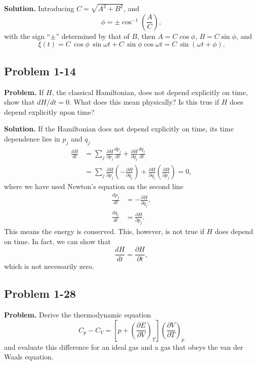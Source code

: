 \documentclass[twocolumn, 10pt]{article}
\numberwithin{equation}{section}
\newenvironment{problem}
{\par\medskip\sffamily \color{problue}
  \textbf{Problem. }\ignorespaces}
{\medskip}
\newenvironment{solution}
{\par\medskip
  \textbf{Solution. }\ignorespaces}
{\medskip}
\begin{document}
\begin{solution}
Introducing $C = \sqrt{A^2 + B^2}$,
and
$$\phi = \pm \cos^{-1} \left( \frac A C \right),$$
with the sign ``$\pm$'' determined by that of $B$,
then $A = C \cos\phi$, $B = C \sin\phi$, and
$$
\xi(t) = C \, \cos\phi \, \sin \omega t + C \, \sin\phi \cos \omega t
= C \, \sin(\omega t + \phi).
$$
\end{solution}


\subsection{Problem 1-14}

\begin{problem}
If $H$, the classical Hamiltonian, does not depend explicitly on time,
show that $dH/dt = 0$.
What does this mean physically?
Is this true if $H$ does depend explicitly upon time?
\end{problem}

\begin{solution}
If the Hamiltonian does not depend explicitly on time,
its time dependence lies in $p_j$ and $q_j$
\begin{align*}
  \frac{dH}{dt}
  &= \sum_j
  \frac{ \partial H } { \partial p_j}
  \frac{ d p_j } { d t }
   +
  \frac{ \partial H } { \partial q_j}
  \frac{ d q_j } { d t }
  \\
  &= \sum_j
  \frac{ \partial H } { \partial p_j}
  \left( - \frac{ \partial H } { \partial q_j} \right)
   +
  \frac{ \partial H } { \partial q_j}
  \left( \frac{ \partial H } { \partial p_j} \right)
  = 0,
\end{align*}
where we have used Newton's equation
on the second line
\begin{align*}
  \frac{ d p_j } { d t }
  &=
  - \frac{ \partial H } { \partial q_j}
  ,
  \\
  \frac{ d q_j } { d t }
  &= \frac{ \partial H } { \partial p_j}
  .
\end{align*}
This means the energy is conserved.
This, however, is not true if $H$ does depend on time.
%
In fact, we can show that
$$
  \frac{ d H } { d t }
  =
  \frac{ \partial H } { \partial t }
  ,
$$
which is not necessarily zero.
\end{solution}


\subsection{Problem 1-28}

\begin{problem}
  Derive the thermodynamic equation
  \begin{equation}
    C_p - C_V
    = \left[ p + \left( \frac{ \partial E } { \partial V } \right)_T \right]
    \left( \frac{ \partial V } { \partial T } \right)_p
    \label{eq:CpCV1}
  \end{equation}
  and evaluate this difference for an ideal gas
  and a gas that obeys the van der Waals equation.
\end{problem}
\end{document}
